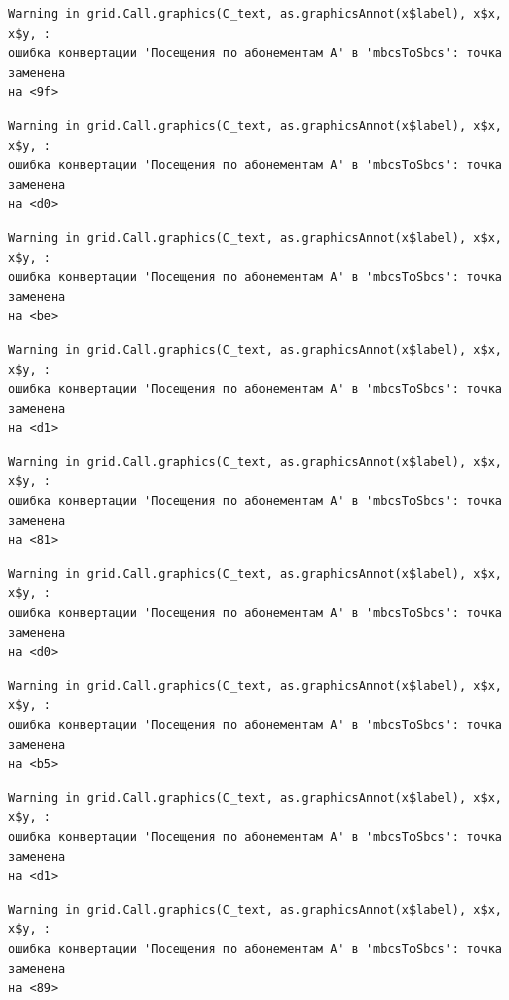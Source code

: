 \documentclass[
  letterpaper,
  DIV=11,
  numbers=noendperiod]{scrreprt}
\begin{document}
\begin{verbatim}
Warning in grid.Call.graphics(C_text, as.graphicsAnnot(x$label), x$x, x$y, :
ошибка конвертации 'Посещения по абонементам А' в 'mbcsToSbcs': точка заменена
на <9f>
\end{verbatim}

\begin{verbatim}
Warning in grid.Call.graphics(C_text, as.graphicsAnnot(x$label), x$x, x$y, :
ошибка конвертации 'Посещения по абонементам А' в 'mbcsToSbcs': точка заменена
на <d0>
\end{verbatim}

\begin{verbatim}
Warning in grid.Call.graphics(C_text, as.graphicsAnnot(x$label), x$x, x$y, :
ошибка конвертации 'Посещения по абонементам А' в 'mbcsToSbcs': точка заменена
на <be>
\end{verbatim}

\begin{verbatim}
Warning in grid.Call.graphics(C_text, as.graphicsAnnot(x$label), x$x, x$y, :
ошибка конвертации 'Посещения по абонементам А' в 'mbcsToSbcs': точка заменена
на <d1>
\end{verbatim}

\begin{verbatim}
Warning in grid.Call.graphics(C_text, as.graphicsAnnot(x$label), x$x, x$y, :
ошибка конвертации 'Посещения по абонементам А' в 'mbcsToSbcs': точка заменена
на <81>
\end{verbatim}

\begin{verbatim}
Warning in grid.Call.graphics(C_text, as.graphicsAnnot(x$label), x$x, x$y, :
ошибка конвертации 'Посещения по абонементам А' в 'mbcsToSbcs': точка заменена
на <d0>
\end{verbatim}

\begin{verbatim}
Warning in grid.Call.graphics(C_text, as.graphicsAnnot(x$label), x$x, x$y, :
ошибка конвертации 'Посещения по абонементам А' в 'mbcsToSbcs': точка заменена
на <b5>
\end{verbatim}

\begin{verbatim}
Warning in grid.Call.graphics(C_text, as.graphicsAnnot(x$label), x$x, x$y, :
ошибка конвертации 'Посещения по абонементам А' в 'mbcsToSbcs': точка заменена
на <d1>
\end{verbatim}

\begin{verbatim}
Warning in grid.Call.graphics(C_text, as.graphicsAnnot(x$label), x$x, x$y, :
ошибка конвертации 'Посещения по абонементам А' в 'mbcsToSbcs': точка заменена
на <89>
\end{verbatim}
\end{document}
